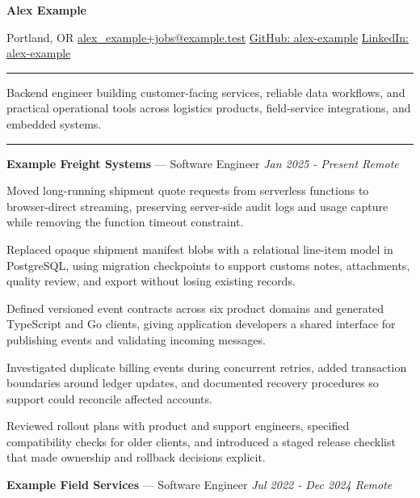 \documentclass[10pt,letterpaper]{article}
\newcommand{\jtsection}[1]{\par\vspace{5pt}{\fontsize{11.5pt}{13pt}\selectfont\bfseries #1}\par\nobreak\vspace{1.5pt}\hrule\vspace{3pt}\nobreak}
\newenvironment{jtitems}
  {\begin{list}{\textbullet}{\setlength{\leftmargin}{12pt}\setlength{\labelwidth}{6pt}\setlength{\labelsep}{6pt}\setlength{\itemsep}{1pt}\setlength{\parsep}{0pt}\setlength{\topsep}{2pt}\setlength{\partopsep}{0pt}}}
  {\end{list}}
\begin{document}
\fontsize{10.5pt}{12pt}\selectfont
{\fontsize{20pt}{22pt}\selectfont\bfseries Alex Example}\par\vspace{2pt}
Portland, OR \textperiodcentered{} \href{mailto:alex\_example+jobs@example.test}{alex\_example+jobs@example.test} \textperiodcentered{} \href{https://github.com/alex-example}{GitHub: alex-example} \textperiodcentered{} \href{https://www.linkedin.com/in/alex-example}{LinkedIn: alex-example}\par
\jtsection{Summary}
Backend engineer building customer-facing services, reliable data workflows, and practical operational tools across logistics products, field-service integrations, and embedded systems.\par
\jtsection{Experience}
\textbf{Example Freight Systems} --- Software Engineer \textperiodcentered{} \textit{Jan 2025 - Present \textperiodcentered{} Remote}\par\nopagebreak[3]
\begin{jtitems}
\item Moved long-running shipment quote requests from serverless functions to browser-direct streaming, preserving server-side audit logs and usage capture while removing the function timeout constraint.
\item Replaced opaque shipment manifest blobs with a relational line-item model in PostgreSQL, using migration checkpoints to support customs notes, attachments, quality review, and export without losing existing records.
\item Defined versioned event contracts across six product domains and generated TypeScript and Go clients, giving application developers a shared interface for publishing events and validating incoming messages.
\item Investigated duplicate billing events during concurrent retries, added transaction boundaries around ledger updates, and documented recovery procedures so support could reconcile affected accounts.
\item Reviewed rollout plans with product and support engineers, specified compatibility checks for older clients, and introduced a staged release checklist that made ownership and rollback decisions explicit.
\end{jtitems}
\vspace{2pt}
\textbf{Example Field Services} --- Software Engineer \textperiodcentered{} \textit{Jul 2022 - Dec 2024 \textperiodcentered{} Remote}\par\nopagebreak[3]
\end{document}
